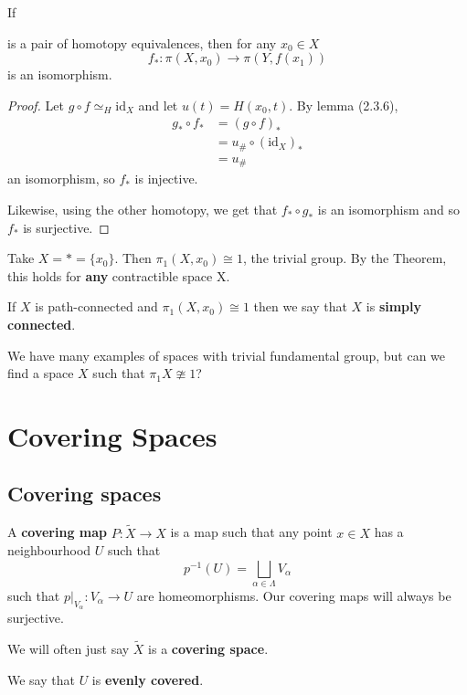 \documentclass{article}
\newcommand{\id}{\mathrm{id}}
\numberwithin{nthm}{subsection}
\begin{document}
\begin{thm}
    If
    is a pair of homotopy equivalences, then for any $x_0 \in X$
    \begin{equation*}
        f_*: \pi(X, x_0) \to \pi(Y, f(x_1))
    \end{equation*}
    is an isomorphism.
\end{thm}

\begin{proof}
    Let $g \circ f \simeq_H \id_X$ and let $u(t) = H(x_0, t)$. By lemma (2.3.6),
    \begin{align*}
        g_* \circ f_* &= (g \circ f)_* \\
                      &= u_{\#} \circ (\id_X)_* \\
                      &= u_{\#}
    \end{align*}
    an isomorphism, so $f_*$ is injective.

    Likewise, using the other homotopy, we get that $f_* \circ g_*$ is an isomorphism and so $f_*$ is surjective.
\end{proof}

\begin{eg}
    Take $X = * = \{x_0\}$. Then $\pi_1(X, x_0) \cong 1$, the trivial group.  By the Theorem, this holds for \textbf{any} contractible space X.
\end{eg}

\begin{defi}
    If $X$ is path-connected and $\pi_1(X, x_0) \cong 1$ then we say that $X$ is \textbf{simply connected}.
\end{defi}

We have many examples of spaces with trivial fundamental group, but can we find a space $X$ such that $\pi_1 X \ncong 1$?

\clearpage
\section{Covering Spaces}

\subsection{Covering spaces}

\begin{ndef}
    A \textbf{covering map} $P: \widetilde{X} \to X$ is a map such that any point $x \in X$ has a neighbourhood $U$ such that
    \begin{equation*}
        p^{-1}(U) = \bigsqcup_{\alpha \in \Lambda} V_\alpha
    \end{equation*}
    such that $p|_{V_\alpha}: V_\alpha \to U$ are homeomorphisms. Our covering maps will always be surjective.

    We will often just say $\widetilde{X}$ is a \textbf{covering space}.

    We say that $U$ is \textbf{evenly covered}.
\end{ndef}
\end{document}
